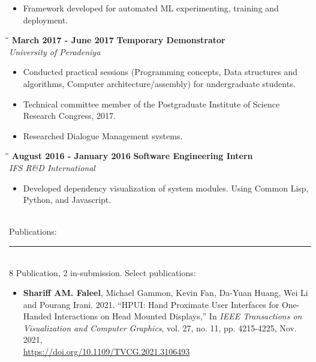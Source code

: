\documentclass[a4paper,10pt]{article}
\begin{document}
{\begin{minipage}[t]{0.60\textwidth}
\begin{itemize}
\begin{itemize}
      \item Framework developed for automated ML experimenting, training and deployment.
      \end{itemize}
    \end{itemize}
    \begin{tabbing}
      \=\hspace*{6cm}\=\hspace*{5cm}\= \kill
      \>\textbf{ March 2017 - June 2017} \> \textbf{Temporary Demonstrator}\\\>\> \emph{University of Peradeniya}
    \end{tabbing}
    \vspace{-0.5cm}
    \begin{itemize}
      \setlength\itemsep{-0.1pt}
    \item Conducted practical sessions (Programming concepts, Data structures and algorithms, Computer architecture/assembly) for undergraduate students. %
    \item Technical committee member of the Postgraduate Institute of Science Research Congress, 2017.
    \item Researched Dialogue Management systems.
    \end{itemize}
    \begin{tabbing}
      \=\hspace*{6cm}\=\hspace*{5cm}\= \kill
      \>\textbf{ August 2016 - January 2016} \> \textbf{Software Engineering Intern}\\\>\> \emph{IFS R\&D International}
    \end{tabbing}
    \vspace{-0.5cm}
    \begin{itemize}
      \setlength\itemsep{-0.1pt}
    \item Developed dependency visualization of system modules. Using Common Lisp, Python, and Javascript.
    \end{itemize}
    \vspace{0.5cm}\\
    {\large Publications:}\vspace{-0.2cm}\\
    \rule{0.75\textwidth}{0.4pt}
    \vspace{0.1cm}\\
    8 Publication, 2 in-submission. Select publications:
    \begin{itemize}
  \item[]\textbf{Shariff AM. Faleel}, Michael Gammon, Kevin Fan, Da-Yuan Huang, Wei Li and Pourang Irani. 2021. ``HPUI: Hand Proximate User Interfaces for One-Handed Interactions on Head Mounted Displays,'' In \textit{IEEE Transactions on Visualization and Computer Graphics}, vol. 27, no. 11, pp. 4215-4225, Nov. 2021,  \\\url{https://doi.org/10.1109/TVCG.2021.3106493}

\end{itemize}
\end{minipage}}
\end{document}
